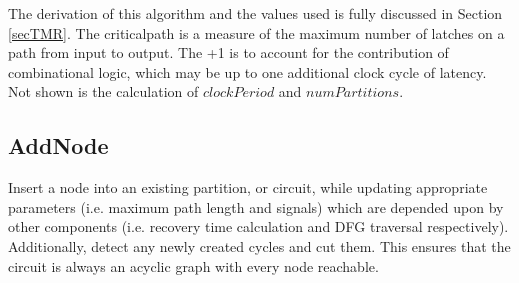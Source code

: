\documentclass[12pt,final,oneside]{dwThesis} %
\begin{document}
   The derivation of this algorithm and the values used is fully discussed in Section \ref{secTMR}. The criticalpath is a measure of the maximum number of latches on a path from input to output. The +1 is to account for the contribution of combinational logic, which may be up to one additional clock cycle of latency.
   Not shown is the calculation of $clockPeriod$ and $numPartitions$.
   


   \newpage
   \subsection{AddNode}
   Insert a node into an existing partition, or circuit, while updating appropriate parameters (i.e. maximum path length and signals) which are depended upon by other components (i.e. recovery time calculation and \ac{DFG} traversal respectively).
   Additionally, detect any newly created cycles and cut them.
   This ensures that the circuit is always an acyclic graph with every node reachable.
\end{document}
